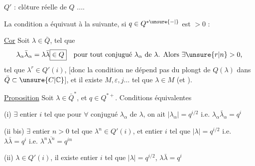 $Q'$ : clôture  réelle de $Q$ ....

La condition a équivaut à la suivante, si $q\in Q^{* \unsure{-|{}}}$ est $>0$ :

\uline{Cor} Soit $\lambda\in\bar Q$, tel que 
\[
\lambda_\alpha\bar\lambda_\alpha=\lambda\bar\lambda\boxed{\in Q}
\quad\text{pour tout conjugué $\lambda_\alpha$ de $\lambda$. Alors $\exists\unsure{r|n}>0$,}
\]
\quad {}
tel que $\lambda^{r}\in Q'(i)$, [donc la condition ne dépend pas du
plongt de $Q(\lambda)$ dans $\bar Q\subset\unsure{C|\mathbb C}$], et 
il existe $M,\varepsilon,j\ldots$  tel que $\lambda\in M$ (et ).

\uline{Proposition} Soit $\lambda\in\bar Q^*$, et $q\in Q^{*+}$. Conditions équivalentes

(i) $\exists$ entier $i$ tel que pour $\forall$ conjugué $\lambda_\alpha$ de $\lambda$, on ait $|\lambda_\alpha|=q^{i/2}$
i.e. $\lambda_\alpha\bar\lambda_\alpha=q^i$

(ii bis) $\exists$ entier $n>0$ tel que $\lambda^n\in Q'(i)$, et  entier $i$ tel que
$|\lambda|=q^{i/2}$ i.e. $\lambda\bar\lambda=q^i$ i.e. $\lambda^n\overline{\lambda^n}=q^{in}$

(ii) $\lambda\in Q'(i)$, il existe entier $i$ tel que $|\lambda|=q^{i/2}$,  $\lambda\bar\lambda=q^i$

